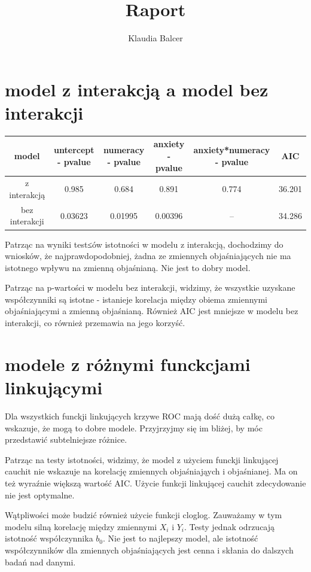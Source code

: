 \documentclass[a4paper,11pt]{article}
\author{Klaudia Balcer}
\title{Raport }
\begin{document}
\maketitle
\tableofcontents
\pagebreak


\section{model z interakcją a model bez interakcji}

\begin{tabular}{|c|c|c|c|c|c|}
model & untercept - pvalue & numeracy - pvalue & anxiety - pvalue & anxiety*numeracy - pvalue & AIC \\ \hline
z interakcją & 0.985 & 0.684 & 0.891 & 0.774 & 36.201 \\
bez interakcji  & 0.03623 & 0.01995 & 0.00396 & -- & 34.286 \\ 
\end{tabular}

Patrząc na wyniki test≤ów istotności w modelu z interakcją, dochodzimy do wniosków, że najprawdopodobniej, żadna ze zmiennych objaśniających nie ma istotnego wpływu na zmienną objaśnianą. Nie jest to dobry model. 

Patrząc na p-wartości w modelu bez interakcji, widzimy, że wszystkie uzyskane współczynniki są istotne - istanieje korelacja między obiema zmiennymi objaśniającymi a zmienną objaśnianą. Również AIC jest mniejsze w modelu bez interakcji, co również przemawia na jego korzyść. 


\section{modele z różnymi funckcjami linkującymi}

Dla wszystkich funckji linkujących krzywe ROC mają dość dużą całkę, co wskazuje, że mogą to dobre modele. Przyjrzyjmy się im bliżej, by móc przedstawić subtelniejsze różnice. 

Patrząc na testy istotności, widzimy, że model z użyciem funckji linkującej cauchit nie wskazuje na korelację zmiennych objaśniająych i objaśnianej. Ma on też wyraźnie większą wartość AIC. Użycie funkcji linkującej cauchit zdecydowanie nie jest optymalne. 

Wątpliwości może budzić również użycie funkcji cloglog. Zauważamy w tym modelu silną korelację między zmiennymi $X_{i}$ i $Y_{i}$. Testy jednak odrzucają istotność współczynnika $b_{0}$. Nie jest to najlepszy model, ale istotność współczynników dla zmiennych objaśniających jest cenna i skłania do dalszych badań nad danymi. 
\end{document}
